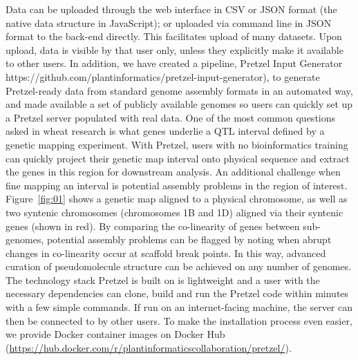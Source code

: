 \documentclass{bioinfo}
\begin{document}
\begin{methods}
Data can be uploaded through the web interface in CSV or JSON format (the native data structure in JavaScript); or uploaded via command line in JSON format to the back-end directly. 
This facilitates upload of many datasets. 
Upon upload, data is visible by that user only, unless they explicitly make it available to other users. 
In addition, we have created a pipeline, Pretzel Input Generator {{https://github.com/plantinformatics/pretzel-input-generator}}), to generate Pretzel-ready data from standard genome assembly formats in an automated way, and made available a set of publicly available genomes so users can quickly set up a Pretzel server populated with real data.
One of the most common questions asked in wheat research is what genes underlie a QTL interval defined by a genetic mapping experiment. 
With Pretzel, users with no bioinformatics training can quickly project their genetic map interval onto physical sequence and extract the genes in this region for downstream analysis. 
An additional challenge when fine mapping an interval is potential assembly problems in the region of interest. Figure~\ref{fig:01} shows a genetic map aligned to a physical chromosome, as well as two syntenic chromosomes (chromosomes 1B and 1D) aligned via their syntenic genes (shown in red). 
By comparing the co-linearity of genes between sub-genomes, potential assembly problems can be flagged by noting when abrupt changes in co-linearity occur at scaffold break points. 
In this way, advanced curation of pseudomolecule structure can be achieved on any number of genomes.
The technology stack Pretzel is built on is lightweight and a user with the necessary dependencies can clone, build and run the Pretzel code within minutes with a few simple commands. 
If run on an internet-facing machine, the server can then be connected to by other users. 
To make the installation process even easier, we provide Docker container images on Docker Hub (\href{https://hub.docker.com/r/plantinformaticscollaboration/pretzel/}{https://hub.docker.com/r/plantinformaticscollaboration/pretzel/}).



\end{methods}
\end{document}
